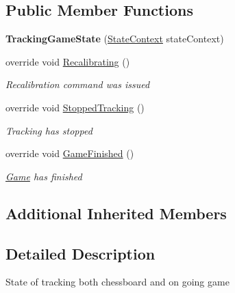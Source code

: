 \subsection*{Public Member Functions}
\begin{DoxyCompactItemize}
\item 
\mbox{\label{class_chess_tracking_1_1_controlling_elements_1_1_program_state_1_1_states_1_1_tracking_game_state_abddf6c2ec6794319c059bdaac5497411}} 
{\bfseries Tracking\+Game\+State} (\mbox{\hyperlink{class_chess_tracking_1_1_controlling_elements_1_1_program_state_1_1_state_context}{State\+Context}} state\+Context)
\item 
override void \mbox{\hyperlink{class_chess_tracking_1_1_controlling_elements_1_1_program_state_1_1_states_1_1_tracking_game_state_a52925b07fb679d59e78b218c7c12d78c}{Recalibrating}} ()
\begin{DoxyCompactList}\small\item\em Recalibration command was issued \end{DoxyCompactList}\item 
override void \mbox{\hyperlink{class_chess_tracking_1_1_controlling_elements_1_1_program_state_1_1_states_1_1_tracking_game_state_a403e1536e7a40f736bc8d4b2e7c7aed1}{Stopped\+Tracking}} ()
\begin{DoxyCompactList}\small\item\em Tracking has stopped \end{DoxyCompactList}\item 
override void \mbox{\hyperlink{class_chess_tracking_1_1_controlling_elements_1_1_program_state_1_1_states_1_1_tracking_game_state_a66e4b6c89dab25aea56c4ca51b5f7b34}{Game\+Finished}} ()
\begin{DoxyCompactList}\small\item\em \mbox{\hyperlink{namespace_chess_tracking_1_1_game}{Game}} has finished \end{DoxyCompactList}\end{DoxyCompactItemize}
\subsection*{Additional Inherited Members}


\subsection{Detailed Description}
State of tracking both chessboard and on going game 



